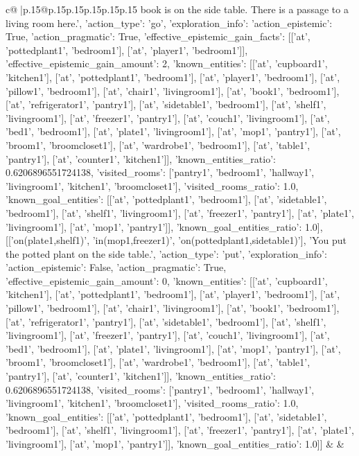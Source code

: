 \documentclass{article}
\begin{document}
{\begin{supertabular}{c@{$\;$}|p{.15\linewidth}@{}p{.15\linewidth}p{.15\linewidth}p{.15\linewidth}p{.15\linewidth}p{.15\linewidth}}
{{{book is on the side table. There is a passage to a living room here.', {'action_type': 'go', 'exploration_info': {'action_epistemic': True, 'action_pragmatic': True, 'effective_epistemic_gain_facts': [['at', 'pottedplant1', 'bedroom1'], ['at', 'player1', 'bedroom1']], 'effective_epistemic_gain_amount': 2, 'known_entities': [['at', 'cupboard1', 'kitchen1'], ['at', 'pottedplant1', 'bedroom1'], ['at', 'player1', 'bedroom1'], ['at', 'pillow1', 'bedroom1'], ['at', 'chair1', 'livingroom1'], ['at', 'book1', 'bedroom1'], ['at', 'refrigerator1', 'pantry1'], ['at', 'sidetable1', 'bedroom1'], ['at', 'shelf1', 'livingroom1'], ['at', 'freezer1', 'pantry1'], ['at', 'couch1', 'livingroom1'], ['at', 'bed1', 'bedroom1'], ['at', 'plate1', 'livingroom1'], ['at', 'mop1', 'pantry1'], ['at', 'broom1', 'broomcloset1'], ['at', 'wardrobe1', 'bedroom1'], ['at', 'table1', 'pantry1'], ['at', 'counter1', 'kitchen1']], 'known_entities_ratio': 0.6206896551724138, 'visited_rooms': ['pantry1', 'bedroom1', 'hallway1', 'livingroom1', 'kitchen1', 'broomcloset1'], 'visited_rooms_ratio': 1.0, 'known_goal_entities': [['at', 'pottedplant1', 'bedroom1'], ['at', 'sidetable1', 'bedroom1'], ['at', 'shelf1', 'livingroom1'], ['at', 'freezer1', 'pantry1'], ['at', 'plate1', 'livingroom1'], ['at', 'mop1', 'pantry1']], 'known_goal_entities_ratio': 1.0}}], [['on(plate1,shelf1)', 'in(mop1,freezer1)', 'on(pottedplant1,sidetable1)'], 'You put the potted plant on the side table.', {'action_type': 'put', 'exploration_info': {'action_epistemic': False, 'action_pragmatic': True, 'effective_epistemic_gain_amount': 0, 'known_entities': [['at', 'cupboard1', 'kitchen1'], ['at', 'pottedplant1', 'bedroom1'], ['at', 'player1', 'bedroom1'], ['at', 'pillow1', 'bedroom1'], ['at', 'chair1', 'livingroom1'], ['at', 'book1', 'bedroom1'], ['at', 'refrigerator1', 'pantry1'], ['at', 'sidetable1', 'bedroom1'], ['at', 'shelf1', 'livingroom1'], ['at', 'freezer1', 'pantry1'], ['at', 'couch1', 'livingroom1'], ['at', 'bed1', 'bedroom1'], ['at', 'plate1', 'livingroom1'], ['at', 'mop1', 'pantry1'], ['at', 'broom1', 'broomcloset1'], ['at', 'wardrobe1', 'bedroom1'], ['at', 'table1', 'pantry1'], ['at', 'counter1', 'kitchen1']], 'known_entities_ratio': 0.6206896551724138, 'visited_rooms': ['pantry1', 'bedroom1', 'hallway1', 'livingroom1', 'kitchen1', 'broomcloset1'], 'visited_rooms_ratio': 1.0, 'known_goal_entities': [['at', 'pottedplant1', 'bedroom1'], ['at', 'sidetable1', 'bedroom1'], ['at', 'shelf1', 'livingroom1'], ['at', 'freezer1', 'pantry1'], ['at', 'plate1', 'livingroom1'], ['at', 'mop1', 'pantry1']], 'known_goal_entities_ratio': 1.0}}]] 
	  } 
	   } 
	   } 
	 & & \\ 
 


\end{supertabular}}
\end{document}
